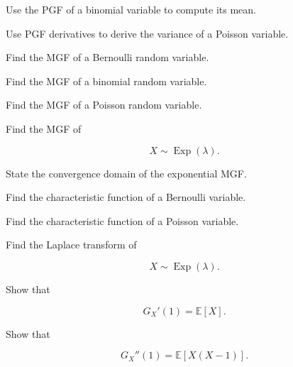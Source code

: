 \begin{exercise}[2]
Use the PGF of a binomial variable to compute its mean.
\end{exercise}

\begin{exercise}[2]
Use PGF derivatives to derive the variance of a Poisson variable.
\end{exercise}

\begin{exercise}[2]
Find the MGF of a Bernoulli random variable.
\end{exercise}

\begin{exercise}[2]
Find the MGF of a binomial random variable.
\end{exercise}

\begin{exercise}[2]
Find the MGF of a Poisson random variable.
\end{exercise}

\begin{exercise}[2]
Find the MGF of

\[
X\sim\operatorname{Exp}(\lambda).
\]
\end{exercise}

\begin{exercise}[2]
State the convergence domain of the exponential MGF.
\end{exercise}

\begin{exercise}[2]
Find the characteristic function of a Bernoulli variable.
\end{exercise}

\begin{exercise}[2]
Find the characteristic function of a Poisson variable.
\end{exercise}

\begin{exercise}[2]
Find the Laplace transform of

\[
X\sim\operatorname{Exp}(\lambda).
\]
\end{exercise}

\begin{exercise}[3]
Show that

\[
G_X'(1)
=
\mathbb{E}[X].
\]
\end{exercise}

\begin{exercise}[3]
Show that

\[
G_X''(1)
=
\mathbb{E}[X(X-1)].
\]
\end{exercise}

